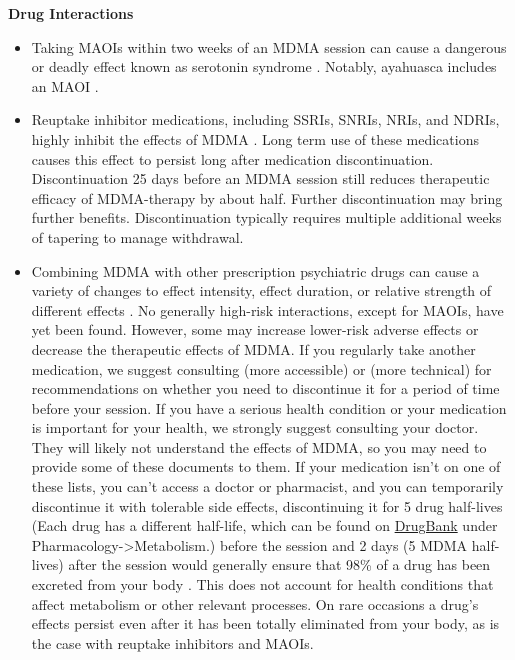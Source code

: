 \documentclass[12pt,letterpaper]{article}
\begin{document}
\noindent \textbf{Drug Interactions}
\begin{itemize}
        \item Taking MAOIs within two weeks of an MDMA session can cause a dangerous or deadly effect known as serotonin syndrome \cite{malcolmSerotonin,edinoffInteractions}. Notably, ayahuasca includes an MAOI \cite{ruffell2020pharmacological}.
    \item Reuptake inhibitor medications, including SSRIs, SNRIs, NRIs, and NDRIs, highly inhibit the effects of MDMA \cite{feducciaSSRIDiscontinuation}. Long term use of these medications causes this effect to persist long after medication discontinuation. Discontinuation 25 days before an MDMA session still reduces therapeutic efficacy of MDMA-therapy by about half. Further discontinuation may bring further benefits. Discontinuation typically requires multiple additional weeks of tapering to manage withdrawal.
    \item Combining MDMA with other prescription psychiatric drugs can cause a variety of changes to effect intensity, effect duration, or relative strength of different effects \cite{sarparastDrugInteractions}. No generally high-risk interactions, except for MAOIs, have yet been found. However, some may increase lower-risk adverse effects or decrease the therapeutic effects of MDMA. If you regularly take another medication, we suggest consulting \textcite{liechtiInteractions} (more accessible) or \textcite{sarparastDrugInteractions} (more technical) for recommendations on whether you need to discontinue it for a period of time before your session. If you have a serious health condition or your medication is important for your health, we strongly suggest consulting your doctor. They will likely not understand the effects of MDMA, so you may need to provide some of these documents to them. If your medication isn't on one of these lists, you can't access a doctor or pharmacist, and you can temporarily discontinue it with tolerable side effects, discontinuing it for 5 drug half-lives (Each drug has a different half-life, which can be found on \href{https://go.drugbank.com}{DrugBank} under Pharmacology->Metabolism.) before the session and 2 days (5 MDMA half-lives) after the session would generally ensure that 98\% of a drug has been excreted from your body \cite{andradeHalf,torrePharmacology}. This does not account for health conditions that affect metabolism or other relevant processes. On rare occasions a drug's effects persist even after it has been totally eliminated from your body, as is the case with reuptake inhibitors and MAOIs.


\end{itemize}
\end{document}
